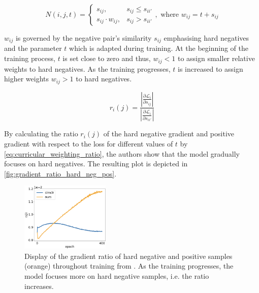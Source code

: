\begin{equation}
    N(i,j,t) = \left\{\begin{array}{ll} s_{ij}, & s_{ij} \le s_{ii'} \\
        s_{ij} \cdot  w_{ij}, & s_{ij} > s_{ii'}\end{array}\right. ,\text{ where }w_{ij} = t + s_{ij}
    \label{eq:curricular_negative_weighting}
\end{equation}

$w_{ij}$ is governed by the negative pair's similarity $s_{ij}$ emphasising hard negatives 
and the parameter $t$ which is adapted during training.
At the beginning of the training process, $t$ is set close to zero and thus, $w_{ij} < 1$ 
to assign smaller relative weights to hard negatives.
As the training progresses, $t$ is increased to assign higher weights $w_{ij} > 1$ to hard negatives.

\begin{equation}
    r_i(j) = \frac{\left| \frac{\partial \mathcal{L}_i}{\partial s_{ij}} \right|}
    {\left| \frac{\partial \mathcal{L}_i}{\partial s_{ii'}} \right|}
    \label{eq:curricular_weighting_ratio}
\end{equation}


By calculating the ratio $r_i(j)$ of the hard negative gradient and positive gradient 
with respect to the loss for different values of $t$ by \eqref{eq:curricular_weighting_ratio}, 
the authors show that the model gradually focuses on hard negatives.
The resulting plot is depicted in \autoref{fig:gradient_ratio_hard_neg_pos}.

\begin{figure}[!htb] %
    \centering
    \includegraphics[width=120pt]{images/ratio_hard_neg_pos_gradients.png}
    \caption{Display of the gradient ratio of hard negative and positive samples (orange) throughout training 
    from \citet{curricular_weighting_2024}.
    As the training progresses, the model focuses more on hard negative samples, i.e. the ratio increases.
    }
    \label{fig:gradient_ratio_hard_neg_pos}
\end{figure}

